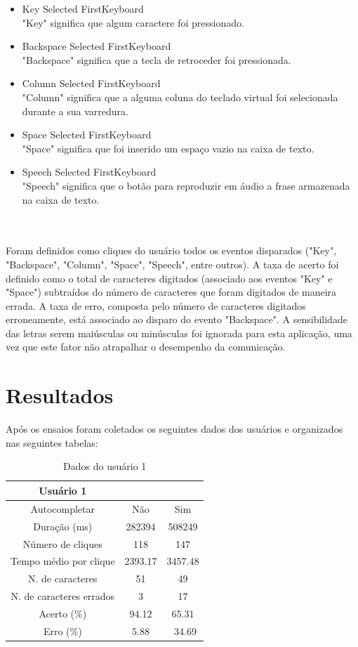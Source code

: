 \documentclass[twoside]{article}
\begin{document}
\begin{multicols}{2}
\begin{itemize}
\item Key Selected FirstKeyboard
\hfill \\
  "Key" significa que algum caractere foi pressionado.
\item Backspace Selected FirstKeyboard
\hfill \\
  "Backspace" significa que a tecla de retroceder foi pressionada.
\item Column Selected FirstKeyboard
\hfill \\
  "Column" significa que a alguma coluna do teclado virtual foi selecionada durante a sua varredura.
\item Space Selected FirstKeyboard
\hfill \\
  "Space" significa que foi inserido um espaço vazio na caixa de texto.
\item Speech Selected FirstKeyboard
\hfill \\
  "Speech" significa que o botão para reproduzir em áudio a frase armazenada na caixa de texto.
\end{itemize}
\\\\
Foram definidos como cliques do usuário todos os eventos disparados ("Key", "Backspace", "Column", "Space", "Speech", entre outros). A taxa de acerto foi definido como o total de caracteres digitados (associado aos eventos "Key" e "Space") subtraídos do número de caracteres que foram digitados de maneira errada. A taxa de erro, composta pelo número de caracteres digitados erroneamente, está associado ao disparo do evento "Backspace".
A sensibilidade das letras serem maiúsculas ou minúsculas foi ignorada para esta aplicação, uma vez que este fator não atrapalhar o desempenho da comunicação.

\section{Resultados}

Após os ensaios foram coletados os seguintes dados dos usuários e organizados nas seguintes tabelas:

\begin{table}[H]
\caption{Dados do usuário 1}
\centering
\begin{tabular}{ccc}
\toprule
 Usuário 1 &  & \\
\midrule
Autocompletar & Não & Sim\\
Duração (ms) & 282394 & 508249\\
Número de cliques & 118 & 147\\
Tempo médio por clique & 2393.17 & 3457.48\\
N. de caracteres & 51 & 49\\
N. de caracteres errados & 3 & 17\\
Acerto (\%) & 94.12 & 65.31\\
Erro (\%) & 5.88 &\ 34.69\\
\bottomrule
\end{tabular}
\end{table}



\end{multicols}
\end{document}
